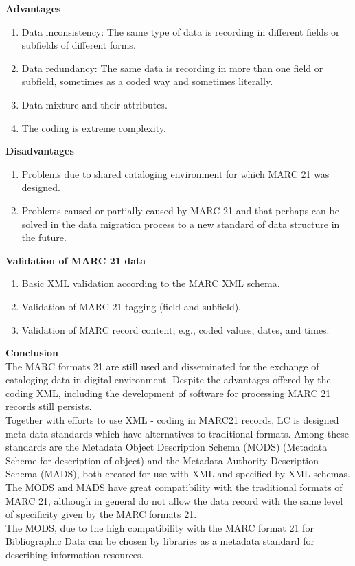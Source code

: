 \begin{enumerate}
	{\bf Advantages}
	\begin{enumerate}
		\item Data inconsistency: The same type of data is recording in different fields or subfields of different forms.
		\item Data redundancy: The same data is recording in more than one field or subfield, sometimes as a coded way and sometimes literally.	
		\item Data mixture and their attributes.
		\item The coding is extreme complexity.
	\end{enumerate}	
	{\bf Disadvantages}
	\begin{enumerate}
		\item Problems due to shared cataloging environment for which MARC 21 was designed.
		\item Problems caused or partially caused by MARC 21 and that perhaps can be solved in the data migration process to a new standard of data structure in the future.
	\end{enumerate}
	
	{\bf Validation of MARC 21 data}
	\begin{enumerate}
		\item Basic XML validation according to the MARC XML schema.
		\item Validation of MARC 21 tagging (field and subfield).
		\item Validation of MARC record content, e.g., coded values, dates, and times.
	\end{enumerate}
	
	{\bf Conclusion}\\
	The MARC formats 21 are still used and disseminated for the exchange of cataloging data in digital environment. 
	Despite the advantages offered by the coding XML, including the development of software for processing MARC 21 records still persists.\\
	Together with efforts to use XML - coding in MARC21 records, LC is designed meta data standards which have alternatives to traditional formats. 
	Among these standards are the Metadata Object Description Schema (MODS) (Metadata Scheme for description of object) and the Metadata Authority Description Schema (MADS), both created for use with XML and specified by XML schemas.\\
	The MODS and MADS have great compatibility with the traditional formats of MARC 21, although in general do not allow the data record with the same level of specificity given by the MARC formats 21.\\
	The MODS, due to the high compatibility with the MARC format 21 for Bibliographic Data can be chosen by libraries as a metadata standard for describing information resources.


\end{enumerate}
